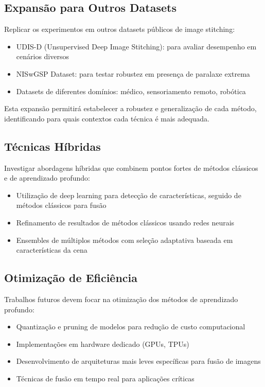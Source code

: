 \subsection{Expansão para Outros Datasets}

Replicar os experimentos em outros datasets públicos de image stitching:

\begin{itemize}
    \item UDIS-D (Unsupervised Deep Image Stitching): para avaliar desempenho em cenários diversos
    \item NISwGSP Dataset: para testar robustez em presença de paralaxe extrema
    \item Datasets de diferentes domínios: médico, sensoriamento remoto, robótica
\end{itemize}

Esta expansão permitirá estabelecer a robustez e generalização de cada método, identificando para quais contextos cada técnica é mais adequada.

\subsection{Técnicas Híbridas}

Investigar abordagens híbridas que combinem pontos fortes de métodos clássicos e de aprendizado profundo:

\begin{itemize}
    \item Utilização de deep learning para detecção de características, seguido de métodos clássicos para fusão
    \item Refinamento de resultados de métodos clássicos usando redes neurais
    \item Ensembles de múltiplos métodos com seleção adaptativa baseada em características da cena
\end{itemize}

\subsection{Otimização de Eficiência}

Trabalhos futuros devem focar na otimização dos métodos de aprendizado profundo:

\begin{itemize}
    \item Quantização e pruning de modelos para redução de custo computacional
    \item Implementações em hardware dedicado (GPUs, TPUs)
    \item Desenvolvimento de arquiteturas mais leves específicas para fusão de imagens
    \item Técnicas de fusão em tempo real para aplicações críticas
\end{itemize}

